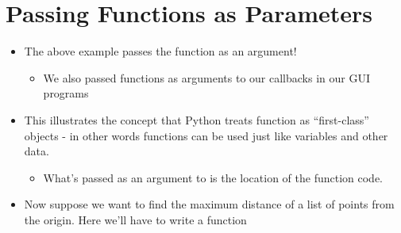 \documentclass[letterpaper,10pt,english]{sphinxmanual}
\begin{document}
\section{Passing Functions as Parameters}
\label{\detokenize{lecture_notes/lec24_functional:passing-functions-as-parameters}}\begin{itemize}
\item {} 
The above example passes the  function as an argument!
\begin{itemize}
\item {} 
We also passed functions as arguments to our callbacks in our GUI
programs

\end{itemize}

\item {} 
This illustrates the concept that Python treats function as
“first-class” objects - in other words functions can be used just
like variables and other data.
\begin{itemize}
\item {} 
What’s passed as an argument to  is the location of
the function code.

\end{itemize}

\item {} 
Now suppose we want to find the maximum distance of a list of points
from the origin.  Here we’ll have to write a function

%
\begin{sphinxVerbatim}[commandchars=\\\{\}]
   
     \PYG{p}{[}\PYG{p}{]}  \PYG{p}{[}\PYG{p}{]}

  \PYG{p}{[}       \PYG{p}{]}
  
\end{sphinxVerbatim}

\end{itemize}
\end{document}
